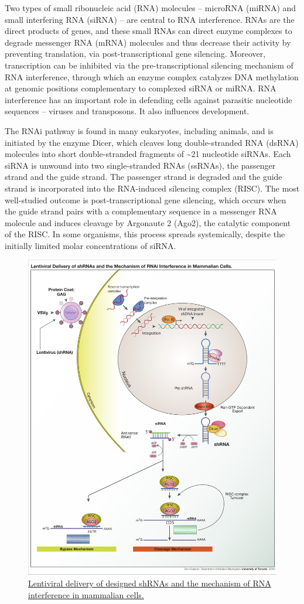 Two types of small ribonucleic acid (RNA) molecules -- microRNA (miRNA) and small interfering RNA (siRNA) -- are central to RNA interference. RNAs are the direct products of genes, and these small RNAs can direct enzyme complexes to degrade messenger RNA (mRNA) molecules and thus decrease their activity by preventing translation, via post-transcriptional gene silencing. Moreover, transcription can be inhibited via the pre-transcriptional silencing mechanism of RNA interference, through which an enzyme complex catalyzes DNA methylation at genomic positions complementary to complexed siRNA or miRNA. RNA interference has an important role in defending cells against parasitic nucleotide sequences -- viruses and transposons. It also influences development.

The RNAi pathway is found in many eukaryotes, including animals, and is initiated by the enzyme Dicer, which cleaves long double-stranded RNA (dsRNA) molecules into short double-stranded fragments of \textasciitilde{}21 nucleotide siRNAs. Each siRNA is unwound into two single-stranded RNAs (ssRNAs), the passenger strand and the guide strand. The passenger strand is degraded and the guide strand is incorporated into the RNA-induced silencing complex (RISC). The most well-studied outcome is post-transcriptional gene silencing, which occurs when the guide strand pairs with a complementary sequence in a messenger RNA molecule and induces cleavage by Argonaute 2 (Ago2), the catalytic component of the RISC. In some organisms, this process spreads systemically, despite the initially limited molar concentrations of siRNA.



\begin{figure}

{\centering \includegraphics[width=0.7\linewidth]{./figures/techniques/ShRNA_Lentivirus} 

}

\caption{\href{https://commons.wikimedia.org/wiki/File:ShRNA_Lentivirus.svg}{Lentiviral delivery of designed shRNAs and the mechanism of RNA interference in mammalian cells.}}\label{fig:sirnacartoon}
\end{figure}

